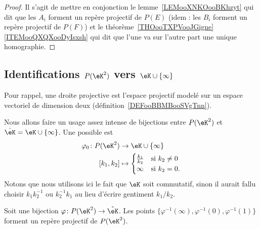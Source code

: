 \begin{proof}
    Il s'agit de mettre en conjonction le lemme~\ref{LEMooXNKOooBKhzyt} qui dit que les \( A_i\) forment un repère projectif de \( P(E)\) (idem : les \( B_i\) forment un repère projectif de \( P(F)\)) et le théorème~\ref{THOooTXPVooJGigne}\ref{ITEMooQXQXooDyIsxsh} qui dit que l'une va sur l'autre part une unique homographie.
\end{proof}

\subsection{Identifications \texorpdfstring{$ P(\eK^2)$}{P(K2)} vers \texorpdfstring{$ \eK\cup\{ \infty \}$}{K u infinity}}

Pour rappel, une droite projective est l'espace projectif modelé sur un espace vectoriel de dimension deux (définition~\ref{DEFooBBMBooSVgTnn}).

\begin{normaltext}      \label{NORMooUQRUooOMIzJD}
    Nous allons faire un usage assez intense de bijections entre \( P(\eK^2)\) et \( \hat\eK=\eK\cup\{ \infty \}\). Une possible est
    \begin{equation}        \label{EQooSIJDooTHPYMb}
        \begin{aligned}
            \varphi_0\colon P(\eK^2)&\to \eK\cup\{ \infty \} \\
            [k_1,k_2]&\mapsto \begin{cases}
                \frac{ k_1 }{ k_2 }    &   \text{si } k_2\neq 0\\
                \infty    &    \text{si } k_2=0.
            \end{cases}
        \end{aligned}
    \end{equation}
    Notons que nous utilisons ici le fait que \( \eK\) soit commutatif, sinon il aurait fallu choisir \( k_1k_2^{-1}\) ou \( k_2^{-1}k_1\) au lieu d'écrire gentiment \( k_1/k_2\).
\end{normaltext}

\begin{corollary}       \label{CORooFJSCooNOeAel}
    Soit une bijection \( \varphi\colon P(\eK^2)\to \hat\eK\). Les points \( \{ \varphi^{-1}(\infty), \varphi^{-1}(0), \varphi^{-1}(1) \}\) forment un repère projectif de \( P(\eK^2)\).
\end{corollary}

